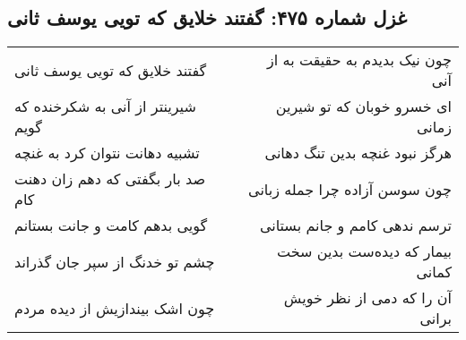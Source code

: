 \begin{center}
\section*{غزل شماره ۴۷۵: گفتند خلایق که تویی یوسف ثانی}
\label{sec:sh475}
\begin{longtable}{l p{0.5cm} r}
گفتند خلایق که تویی یوسف ثانی
&&
چون نیک بدیدم به حقیقت به از آنی
\\
شیرینتر از آنی به شکرخنده که گویم
&&
ای خسرو خوبان که تو شیرین زمانی
\\
تشبیه دهانت نتوان کرد به غنچه
&&
هرگز نبود غنچه بدین تنگ دهانی
\\
صد بار بگفتی که دهم زان دهنت کام
&&
چون سوسن آزاده چرا جمله زبانی
\\
گویی بدهم کامت و جانت بستانم
&&
ترسم ندهی کامم و جانم بستانی
\\
چشم تو خدنگ از سپر جان گذراند
&&
بیمار که دیده‌ست بدین سخت کمانی
\\
چون اشک بیندازیش از دیده مردم
&&
آن را که دمی از نظر خویش برانی
\\
\end{longtable}
\end{center}
